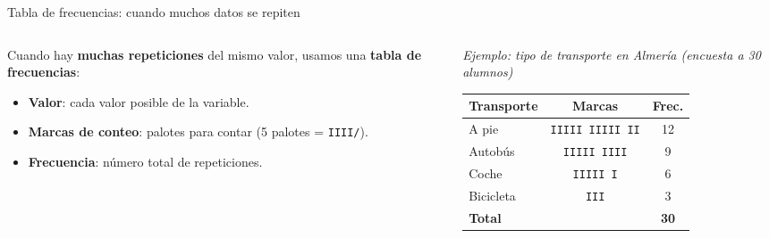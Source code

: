 \documentclass[aspectratio=169, 10pt, spanish]{beamer}
\begin{document}
\begin{frame}{Tabla de frecuencias: cuando muchos datos se repiten}
  \begin{columns}[T]
    \begin{column}{0.50\textwidth}
      \begin{teoriabox}
        \AlmFontSmall
        Cuando hay \textbf{muchas repeticiones} del mismo valor,
        usamos una \textbf{tabla de frecuencias}:
        \begin{itemize}
          \item \textbf{Valor}: cada valor posible de la variable.
          \item \textbf{Marcas de conteo}: palotes para contar
                (5 palotes = \texttt{IIII\hspace{-1pt}/}).
          \item \textbf{Frecuencia}: número total de repeticiones.
        \end{itemize}
      \end{teoriabox}
    \end{column}
    \begin{column}{0.46\textwidth}
      \begin{center}
      \AlmFontSmall
      \textit{Ejemplo: tipo de transporte en Almería (encuesta a 30 alumnos)}\\[4pt]
      \renewcommand{\arraystretch}{1.25}
      \begin{tabular}{lcc}
        \toprule
        \rowcolor{AlmAzul!12}
        \textbf{Transporte} & \textbf{Marcas} & \textbf{Frec.} \\
        \midrule
        A pie      & \texttt{IIIII IIIII II}  & 12 \\
        \rowcolor{AlmFondo}
        Autobús    & \texttt{IIIII IIII}       &  9 \\
        Coche      & \texttt{IIIII I}          &  6 \\
        \rowcolor{AlmFondo}
        Bicicleta  & \texttt{III}              &  3 \\
        \midrule
        \textbf{Total} & & \textbf{30} \\
        \bottomrule
      \end{tabular}
      \end{center}
    \end{column}
  \end{columns}
\end{frame}
\end{document}
